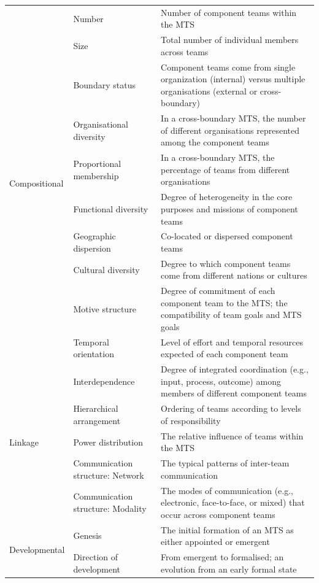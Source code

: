 \begin{center}
\begin{longtable}{ | p{2.5cm} | p{4cm} | p{8cm} | }
	\multirow{10}{*}{Compositional} & Number & Number of component teams within the MTS \\ \cline{2-3}
 	& Size & Total number of individual members across teams \\ \cline{2-3}
 	& Boundary status & Component teams come from single organization (internal) versus multiple organisations (external or cross-boundary) \\ \cline{2-3}
 	& Organisational diversity & In a cross-boundary MTS, the number of different organisations represented among the component teams \\ \cline{2-3}
	& Proportional membership & In a cross-boundary MTS, the percentage of teams from different organisations \\ \cline{2-3}
	& Functional diversity & Degree of heterogeneity in the core purposes and missions of component teams \\ \cline{2-3}
	& Geographic dispersion & Co-located or dispersed component teams \\ \cline{2-3}
	& Cultural diversity & Degree to which component teams come from different nations or cultures \\ \cline{2-3}
	& Motive structure & Degree of commitment of each component team to the MTS; the compatibility of team goals and MTS goals \\ \cline{2-3}
	& Temporal orientation & Level of effort and temporal resources expected of each component team \\ \cline{2-3}
\hline
	\multirow{5}{*}{Linkage} & Interdependence & Degree of integrated coordination (e.g., input, process, outcome) among members of different component teams \\ \cline{2-3}
 	& Hierarchical arrangement & Ordering of teams according to levels of responsibility \\ \cline{2-3}
 	& Power distribution & The relative influence of teams within the MTS \\ \cline{2-3}
	& Communication structure: Network & The typical patterns of inter-team communication \\ \cline{2-3}
	& Communication structure: Modality & The modes of communication (e.g., electronic, face-to-face, or mixed) that occur across component teams \\ \cline{2-3}
\hline
	\multirow{6}{*}{Developmental} & Genesis & The initial formation of an MTS as either appointed or emergent \\ \cline{2-3}
 	& Direction of development & From emergent to formalised; an evolution from an early formal state \\ \cline{2-3}

\end{longtable}
\end{center}
